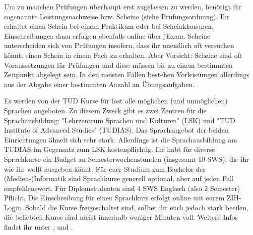 Um zu manchen Prüfungen überhaupt erst zugelassen zu werden, benötigt ihr sogenannte Leistungsnachweise bzw. Scheine (siehe Prüfungsordnung).
Ihr erhaltet einen Schein bei einem Praktikum oder bei Scheinklausuren.
Einschreibungen dazu erfolgen ebenfalls online über jExam.
Scheine unterscheiden sich von Prüfungen insofern, dass ihr unendlich oft versuchen könnt, einen Schein in einem Fach zu erhalten.
Aber Vorsicht: Scheine sind oft Voraussetzungen für Prüfungen und diese müssen bis zu einem bestimmten Zeitpunkt abgelegt sein.
In den meisten Fällen bestehen Vorleistungen allerdings aus der Abgabe einer bestimmten Anzahl an Übungsaufgaben.


Es werden von der TUD Kurse für fast alle möglichen (und unmöglichen) Sprachen angeboten.
Zu diesem Zweck gibt es zwei Zentren für die Sprachausbildung: "Lehrzentrum Sprachen und Kulturen" (LSK) und "TUD Institute of Advanced Studies" (TUDIAS).
Das Sprachangebot der beiden Einrichtungen ähnelt sich sehr stark. Allerdings ist die Sprachausbildung am TUDIAS im Gegensatz zum LSK kostenpflichtig.
Ihr habt für diverse Sprachkurse ein Budget an Semesterwochenstunden (insgesamt 10 SWS), die ihr wie ihr wollt ausgeben könnt.
Für euer Studium zum Bachelor der (Medien-)Informatik sind Sprachkurse generell optional, aber auf jeden Fall empfehlenswert.
Für Diplomstudenten sind 4 SWS Englisch (also 2 Semester) Pflicht.
Die Einschreibung für einen Sprachkurs erfolgt online \link mit eurem ZIH-Login.
Sobald die Kurse freigeschaltet sind, solltet ihr euch jedoch stark beeilen, die beliebten Kurse sind meist innerhalb weniger Minuten voll.
Weitere Infos findet ihr unter \link, \link und \link.
